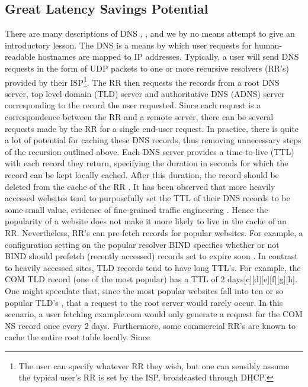 \documentclass[sigconf,nonacm,10pt]{acmart}
\begin{document}
\subsection{Great Latency Savings
Potential}\label{great-latency-savings-potential-1}

There are many descriptions of DNS \cite{kurose2010computer},
\cite{cloudflare_dns_tutorial}, and we by no means attempt to give an
introductory lesson. The DNS is a means by which user requests for
human-readable hostnames are mapped to IP addresses. Typically, a user
will send DNS requests in the form of UDP packets to one or more
recursive resolvers (RR's) provided by their
ISP\footnote{ The user can specify whatever RR they wish, but one can sensibly assume the typical user's RR is set by the ISP, broadcasted through DHCP. }.
The RR then requests the records from a root DNS server, top level
domain (TLD) server and authoritative DNS (ADNS) server corresponding to
the record the user requested. Since each request is a correspondence
between the RR and a remote server, there can be several requests made
by the RR for a single end-user request. \break \break
In practice, there is quite a lot of potential for caching these DNS
records, thus removing unnecessary steps of the recursion outlined
above. Each DNS server provides a time-to-live (TTL) with each record
they return, specifying the duration in seconds for which the record can
be kept locally cached. After this duration, the record should be
deleted from the cache of the RR \cite{rfc_1035}. It has been observed
that more heavily accessed websites tend to purposefully set the TTL of
their DNS records to be some small value, evidence of fine-grained
traffic engineering \cite{callahan2013modern}. Hence the popularity of a
website does not make it more likely to live in the cache of an RR.
Nevertheless, RR's can pre-fetch records for popular websites. For
example, a configuration setting on the popular resolver BIND specifies
whether or not BIND should prefetch (recently accessed) records set to
expire soon \cite{bind9_config}. In contrast to heavily accessed sites,
TLD records tend to have long TTL's. For example, the COM TLD record
(one of the most popular) has a TTL of 2
days{[}c{]}{[}d{]}{[}e{]}{[}f{]}{[}g{]}{[}h{]}. One might speculate
that, since the most popular websites fall into ten or so popular TLD's
\cite{alexa_topsites}, that a request to the root server would rarely
occur. In this scenario, a user fetching example.com would only generate
a request for the COM NS record once every 2 days. Furthermore, some
commercial RR's are known to cache the entire root table locally. Since
\end{document}

